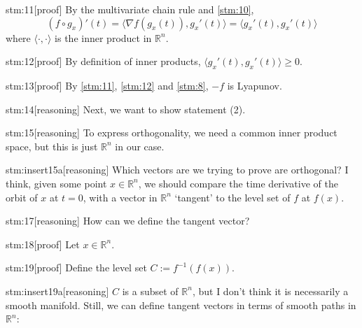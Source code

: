 \documentclass{article}
\begin{document}
\begin{stm}{stm:11}[proof]
By the multivariate chain rule and \ref{stm:10}, $$(f \circ g_x)'(t) = \langle \nabla f(g_x(t)), g_x'(t) \rangle = \langle g_x'(t), g_x'(t) \rangle$$ where $\langle \cdot, \cdot \rangle$ is the inner product in $\mathbb{R}^n$. 
\end{stm}

\begin{stm}{stm:12}[proof]
By definition of inner products, $\langle g_x'(t), g_x'(t) \rangle \ge 0$.
\end{stm}

\begin{stm}{stm:13}[proof]
By \ref{stm:11}, \ref{stm:12} and \ref{stm:8}, $-f$ is Lyapunov.
\end{stm}

\begin{stm}{stm:14}[reasoning]
Next, we want to show statement (2).
\end{stm}

\begin{stm}{stm:15}[reasoning]
To express orthogonality, we need a common inner product space, but this is just $\mathbb{R}^n$ in our case.
\end{stm}

\begin{stm}{stm:insert15a}[reasoning]
Which vectors are we trying to prove are orthogonal? I think, given some point $x \in \mathbb{R}^n$, we should compare the time derivative of the orbit of $x$ at $t=0$, with a vector in $\mathbb{R}^n$ ‘tangent’ to the level set of $f$ at $f(x)$.
\end{stm}

\begin{stm}{stm:17}[reasoning]
How can we define the tangent vector?
\end{stm}

\begin{stm}{stm:18}[proof]
Let $x \in \mathbb{R}^n$.
\end{stm}

\begin{stm}{stm:19}[proof]
Define the level set $C := f^{-1}(f(x))$.
\end{stm}

\begin{stm}{stm:insert19a}[reasoning]
$C$ is a subset of $\mathbb{R}^n$, but I don't think it is necessarily a smooth manifold. Still, we can define tangent vectors in terms of smooth paths in $\mathbb{R}^n$:
\end{stm}
\end{document}
